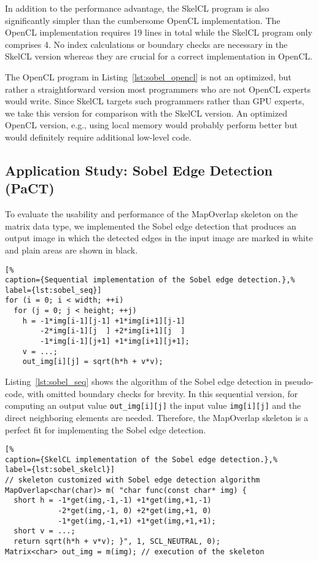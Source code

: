 In addition to the performance advantage, the SkelCL program is also significantly simpler than the cumbersome OpenCL implementation.
The OpenCL implementation requires 19 lines in total while the SkelCL program only comprises 4.
No index calculations or boundary checks are necessary in the SkelCL version whereas they are crucial for a correct implementation in OpenCL.

The OpenCL program in Listing~\ref{lst:sobel_opencl} is not an optimized, but rather a straightforward version most programmers who are not OpenCL experts would write.
Since SkelCL targets such programmers rather than GPU experts, we take this version for comparison with the SkelCL version.
An optimized OpenCL version, e.g., using local memory would probably perform better but would definitely require additional low-level code.

\subsection{Application Study: Sobel Edge Detection (PaCT)}
\label{sec:application_study}
To evaluate the  usability and performance of the MapOverlap skeleton on the matrix data type, we implemented the Sobel edge detection that produces an output image in which the detected edges in the input image are marked in white and plain areas are shown in black.

\bigskip
\begin{lstlisting}[%
caption={Sequential implementation of the Sobel edge detection.},%
label={lst:sobel_seq}]
for (i = 0; i < width; ++i)
  for (j = 0; j < height; ++j)
    h = -1*img[i-1][j-1] +1*img[i+1][j-1]
        -2*img[i-1][j  ] +2*img[i+1][j  ]
        -1*img[i-1][j+1] +1*img[i+1][j+1];
    v = ...;
    out_img[i][j] = sqrt(h*h + v*v);
\end{lstlisting}
\bigskip

Listing~\ref{lst:sobel_seq} shows the algorithm of the Sobel edge detection in pseudo-code, with omitted boundary checks for brevity.
In this sequential version, for computing an output value \texttt{out\_img[i][j]} the input value \texttt{img[i][j]} and the direct neighboring elements are needed.
Therefore, the MapOverlap skeleton is a perfect fit for implementing the Sobel edge detection.

\bigskip
\begin{lstlisting}[%
caption={SkelCL implementation of the Sobel edge detection.},%
label={lst:sobel_skelcl}]
// skeleton customized with Sobel edge detection algorithm
MapOverlap<char(char)> m( "char func(const char* img) {
  short h = -1*get(img,-1,-1) +1*get(img,+1,-1)
            -2*get(img,-1, 0) +2*get(img,+1, 0)
            -1*get(img,-1,+1) +1*get(img,+1,+1);
  short v = ...;
  return sqrt(h*h + v*v); }", 1, SCL_NEUTRAL, 0);
Matrix<char> out_img = m(img); // execution of the skeleton
\end{lstlisting}
\bigskip

